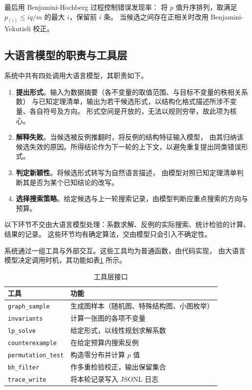最后用 Benjamini-Hochberg 过程控制错误发现率：
将 $p$ 值升序排列，取满足 $p_{(i)} \leq i q / m$ 的最大 $i$，保留前 $i$ 条。
当候选之间存在正相关时改用 Benjamini-Yekutieli 校正。

\subsection{大语言模型的职责与工具层}

系统中共有四处调用大语言模型，其职责如下。

\begin{enumerate}
  \item \textbf{提出形式}。输入为数据摘要（各不变量的取值范围、与目标不变量的秩相关系数）
  与已知定理清单，输出为若干候选形式，以结构化格式描述所涉不变量、各自符号及方向。
  形式空间是开放的，无法以规则穷举，故此项为核心。
  \item \textbf{解释失败}。当候选被反例推翻时，将反例的结构特征输入模型，
  由其归纳该候选失效的原因。所得结论作为下一轮的上下文，以避免重复提出同类错误形式。
  \item \textbf{判定新颖性}。将候选形式转写为自然语言描述，
  由模型对照已知定理清单判断其是否为某个已知结论的改写。
  \item \textbf{选择搜索策略}。给定候选与上一轮搜索记录，由模型判断应重点搜索的方向与预算。
\end{enumerate}

以下环节不交由大语言模型处理：系数求解、反例的实际搜索、统计检验的计算、结果的记录。
这些环节均有确定算法，交由模型只会引入不确定性。

系统通过一组工具与外部交互。这些工具均为普通函数，由代码实现，
由大语言模型决定调用时机，其功能如表\ref{tab:tools} 所示。

\begin{table}[H]
\centering
\small
\caption{工具层接口}
\label{tab:tools}
\begin{tabular}{@{}ll@{}}
\toprule
工具 & 功能 \\
\midrule
\texttt{graph\_sample} & 生成图样本（随机图、特殊结构图、小图枚举） \\
\texttt{invariants} & 计算一张图的各项不变量 \\
\texttt{lp\_solve} & 给定形式，以线性规划求解系数 \\
\texttt{counterexample} & 在给定预算内搜索反例 \\
\texttt{permutation\_test} & 构造零分布并计算 $p$ 值 \\
\texttt{bh\_filter} & 作多重检验校正，输出保留集合 \\
\texttt{trace\_write} & 将本轮记录写入 JSONL 日志 \\
\bottomrule
\end{tabular}
\end{table}

